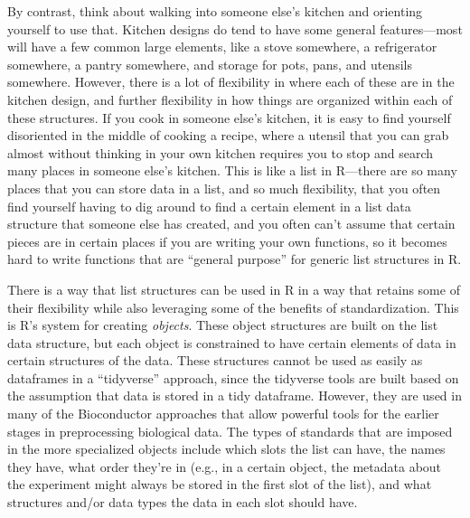 \documentclass[]{tufte-book}
\begin{document}
By contrast, think about walking into someone else's kitchen and orienting yourself
to use that. Kitchen designs do tend to have some general features---most will have
a few common large elements, like a stove somewhere, a refrigerator somewhere,
a pantry somewhere, and storage for pots, pans, and utensils somewhere. However,
there is a lot of flexibility in where each of these are in the kitchen design,
and further flexibility in how things are organized within each of these structures.
If you cook in someone else's kitchen, it is easy to find yourself disoriented in the
middle of cooking a recipe, where a utensil that you can grab almost without
thinking in your own kitchen requires you to stop and search many places in
someone else's kitchen. This is like a list in R---there are so many places that
you can store data in a list, and so much flexibility, that you often find yourself
having to dig around to find a certain element in a list data structure that someone
else has created, and you often can't assume that certain pieces are in certain
places if you are writing your own functions, so it becomes hard to write
functions that are ``general purpose'' for generic list structures in R.

There is a way that list structures can be used in R in a way that retains some
of their flexibility while also leveraging some of the benefits of
standardization. This is R's system for creating \emph{objects}. These object
structures are built on the list data structure, but each object is constrained
to have certain elements of data in certain structures of the data. These
structures cannot be used as easily as dataframes in a ``tidyverse'' approach,
since the tidyverse tools are built based on the assumption that data is stored
in a tidy dataframe. However, they are used in many of the Bioconductor
approaches that allow powerful tools for the earlier stages in preprocessing
biological data. The types of standards that are imposed in the more specialized
objects include which slots the list can have, the names they have, what order
they're in (e.g., in a certain object, the metadata about the experiment might
always be stored in the first slot of the list), and what structures and/or data
types the data in each slot should have.
\end{document}
